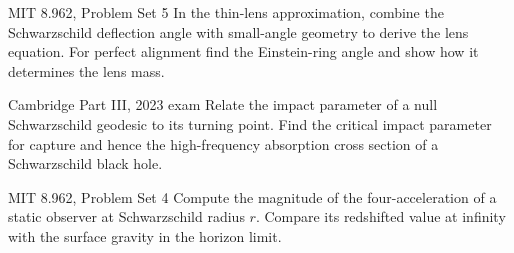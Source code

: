 \begin{exercise}{MIT 8.962, Problem Set 5}
In the thin-lens approximation, combine the Schwarzschild deflection angle
with small-angle geometry to derive the lens equation.  For perfect alignment
find the Einstein-ring angle and show how it determines the lens mass.
\end{exercise}

\begin{exercise}{Cambridge Part III, 2023 exam}
Relate the impact parameter of a null Schwarzschild geodesic to its turning
point.  Find the critical impact parameter for capture and hence the
high-frequency absorption cross section of a Schwarzschild black hole.
\end{exercise}

\begin{exercise}{MIT 8.962, Problem Set 4}
Compute the magnitude of the four-acceleration of a static observer at
Schwarzschild radius \(r\).  Compare its redshifted value at infinity with the
surface gravity in the horizon limit.
\end{exercise}
